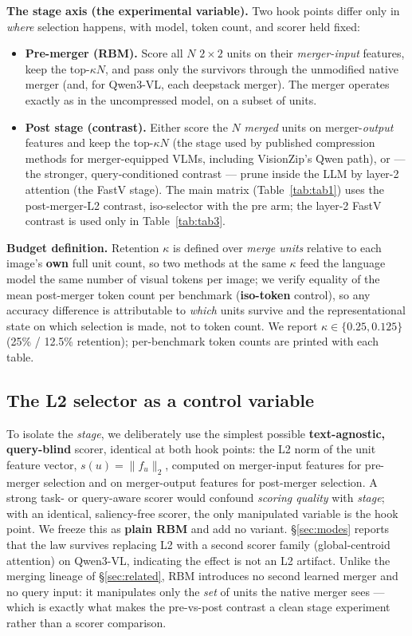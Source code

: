 \documentclass[sigconf,review,anonymous]{acmart}
\begin{document}
\textbf{The stage axis (the experimental variable).} Two hook points differ only
in \emph{where} selection happens, with model, token count, and scorer held
fixed:
\begin{itemize}
  \item \textbf{Pre-merger (RBM).} Score all $N$ $2\!\times\!2$ units on their
    \emph{merger-input} features, keep the top-$\kappa N$, and pass only the
    survivors through the unmodified native merger (and, for Qwen3-VL, each
    deepstack merger). The merger operates exactly as in the uncompressed model,
    on a subset of units.
  \item \textbf{Post stage (contrast).} Either score the $N$ \emph{merged} units
    on merger-\emph{output} features and keep the top-$\kappa N$ (the stage used
    by published compression methods for merger-equipped VLMs, including
    VisionZip's Qwen path), or --- the stronger, query-conditioned contrast ---
    prune inside the LLM by layer-2 attention (the FastV stage). The main
    matrix (Table~\ref{tab:tab1}) uses the post-merger-L2
    contrast, iso-selector with the pre arm; the layer-2 FastV contrast is used
    only in Table~\ref{tab:tab3}.
\end{itemize}

\textbf{Budget definition.} Retention $\kappa$ is defined over \emph{merge
units} relative to each image's \textbf{own} full unit count, so two methods at
the same $\kappa$ feed the language model the same number of visual tokens per
image; we verify equality of the mean post-merger token count per benchmark
(\textbf{iso-token} control), so any accuracy difference is attributable to
\emph{which} units survive and the representational state on which selection is
made, not to token count. We report $\kappa \in \{0.25, 0.125\}$ (25\% / 12.5\%
retention); per-benchmark token counts are printed with each table.

\subsection{The L2 selector as a control variable}\label{sec:selector}

To isolate the \emph{stage}, we deliberately use the simplest possible
\textbf{text-agnostic, query-blind} scorer, identical at both hook points: the
L2 norm of the unit feature vector, $s(u) = \| f_u \|_2$, computed on
merger-input features for pre-merger selection and on merger-output features for
post-merger selection. A strong task- or query-aware scorer would confound
\emph{scoring quality} with \emph{stage}; with an identical, saliency-free
scorer, the only manipulated variable is the hook point. We freeze this as
\textbf{plain RBM} and add no variant. \S\ref{sec:modes} reports that the law
survives replacing L2 with a second scorer family (global-centroid attention) on
Qwen3-VL, indicating the effect is not an L2 artifact. Unlike the merging
lineage of \S\ref{sec:related}, RBM introduces no second learned merger and no
query input: it manipulates only the \emph{set} of units the native merger sees
--- which is exactly what makes the pre-vs-post contrast a clean stage
experiment rather than a scorer comparison.
\end{document}
